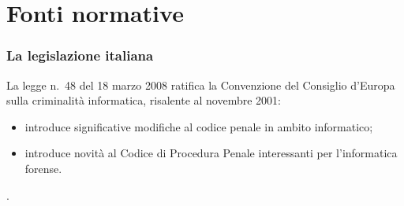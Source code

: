 \documentclass[11pt]{beamer}
\begin{document}
	\section{Fonti normative}
	\begin{frame}
		\frametitle{La legislazione italiana}
		La legge n.~48 del 18 marzo 2008\cite{L_48/2008_2016-03-04} ratifica la Convenzione del Consiglio d'Europa sulla criminalità informatica, risalente al novembre 2001:
		\begin{itemize}
			\item introduce significative modifiche al codice penale in ambito informatico;
			\item introduce novità al Codice di Procedura Penale interessanti per l'informatica forense.
		\end{itemize}. 
	\end{frame}
	
\end{document}
